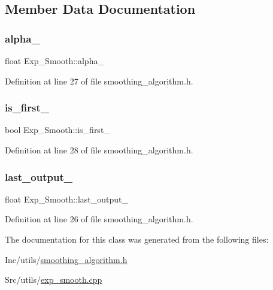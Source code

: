 \subsection{Member Data Documentation}
\mbox{\label{class_exp___smooth_a0406c67c983a212c0e744fff4672399b}} 
\subsubsection{\texorpdfstring{alpha\_}{alpha\_}}
{\footnotesize\ttfamily float Exp\+\_\+\+Smooth\+::alpha\+\_\+\hspace{0.3cm}{\ttfamily [private]}}



Definition at line 27 of file smoothing\+\_\+algorithm.\+h.

\mbox{\label{class_exp___smooth_af3defd741b8369bbbbfea3ddeee2c20c}} 
\subsubsection{\texorpdfstring{is\_first\_}{is\_first\_}}
{\footnotesize\ttfamily bool Exp\+\_\+\+Smooth\+::is\+\_\+first\+\_\+\hspace{0.3cm}{\ttfamily [private]}}



Definition at line 28 of file smoothing\+\_\+algorithm.\+h.

\mbox{\label{class_exp___smooth_aff65e096d091a21d1cec4fb5b7300269}} 
\subsubsection{\texorpdfstring{last\_output\_}{last\_output\_}}
{\footnotesize\ttfamily float Exp\+\_\+\+Smooth\+::last\+\_\+output\+\_\+\hspace{0.3cm}{\ttfamily [private]}}



Definition at line 26 of file smoothing\+\_\+algorithm.\+h.



The documentation for this class was generated from the following files\+:\begin{DoxyCompactItemize}
\item 
Inc/utils/\mbox{\hyperlink{smoothing__algorithm_8h}{smoothing\+\_\+algorithm.\+h}}\item 
Src/utils/\mbox{\hyperlink{exp__smooth_8cpp}{exp\+\_\+smooth.\+cpp}}\end{DoxyCompactItemize}
